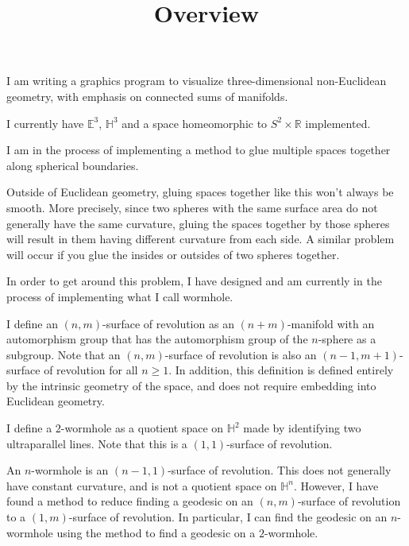 \documentclass[12pt]{amsart}
\begin{document}
\title{Overview}
\maketitle

I am writing a graphics program to visualize three-dimensional non-Euclidean geometry, with emphasis on connected sums of manifolds.

I currently have $\mathbb{E}^3$, $\mathbb{H}^3$ and a space homeomorphic to $S^2 \times \mathbb{R}$ implemented.

I am in the process of implementing a method to glue multiple spaces together along spherical boundaries.

Outside of Euclidean geometry, gluing spaces together like this won't always be smooth. More precisely, since two spheres with the same surface area do not generally have the same curvature, gluing the spaces together by those spheres will result in them having different curvature from each side. A similar problem will occur if you glue the insides or outsides of two spheres together.

In order to get around this problem, I have designed and am currently in the process of implementing what I call wormhole.

I define an $(n,m)$-surface of revolution as an $(n+m)$-manifold with an automorphism group that has the automorphism group of the $n$-sphere as a subgroup. Note that an $(n,m)$-surface of revolution is also an $(n-1,m+1)$-surface of revolution for all $n \geq 1$. In addition, this definition is defined entirely by the intrinsic geometry of the space, and does not require embedding into Euclidean geometry.


I define a $2$-wormhole as a quotient space on $\mathbb{H}^2$ made by identifying two ultraparallel lines. Note that this is a $(1,1)$-surface of revolution.

An $n$-wormhole is an $(n-1,1)$-surface of revolution. This does not generally have constant curvature, and is not a quotient space on $\mathbb{H}^n$. However, I have found a method to reduce finding a geodesic on an $(n,m)$-surface of revolution to a $(1,m)$-surface of revolution. In particular, I can find the geodesic on an $n$-wormhole using the method to find a geodesic on a $2$-wormhole.
\end{document}
